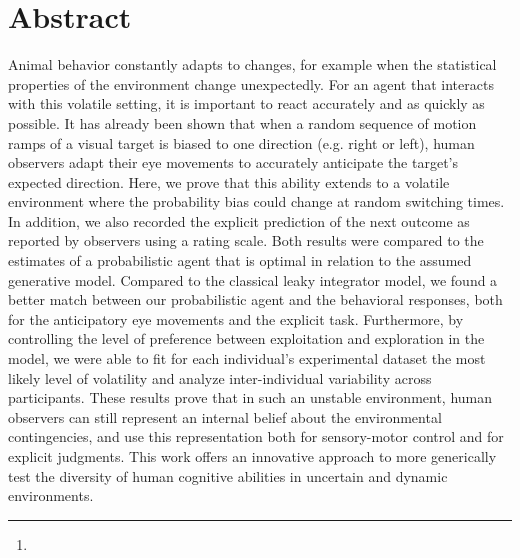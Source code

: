 \documentclass[10pt,letterpaper]{article}
\title{\Title}%
\author{\AuthorA,
\AuthorB,
\AuthorC\thanks{\Address} }
\begin{document}
%
\maketitle%
\section*{Abstract}
Animal behavior constantly adapts to changes, for example when the statistical properties of the environment change unexpectedly. For an agent that interacts with this volatile setting, it is important to react accurately and as quickly as possible. It has already been shown that when a random sequence of motion ramps of a visual target is biased to one direction (e.g. right or left), human observers adapt their eye movements to accurately anticipate the target's expected direction. Here, we prove that this ability extends to a volatile environment where the probability bias could change at random switching times. In addition, we also recorded the explicit prediction of the next outcome as reported by observers using a rating scale. Both results were compared to the estimates of a probabilistic agent that is optimal in relation to the assumed generative model. Compared to the classical leaky integrator model, we found a better match between our probabilistic agent and the behavioral responses, both for the anticipatory eye movements and the explicit task. Furthermore, by controlling the level of preference between exploitation and exploration in the model, we were able to fit for each individual's experimental dataset the most likely level of volatility and analyze inter-individual variability across participants. These results prove that in such an unstable environment, human observers can still represent an internal belief about the environmental contingencies, and use this representation both for sensory-motor control and for explicit judgments. This work offers an innovative approach to more generically test the diversity of human cognitive abilities in uncertain and dynamic environments.
\end{document}
